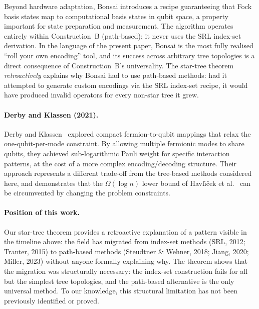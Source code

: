 Beyond hardware adaptation, Bonsai introduces a recipe guaranteeing
that Fock basis states map to computational basis states in qubit
space, a property important for state preparation and measurement.
The algorithm operates entirely within Construction~B (path-based);
it never uses the SRL index-set derivation.  In the language of the
present paper, Bonsai is the most fully realised ``roll your own
encoding'' tool, and its success across arbitrary tree topologies is
a direct consequence of Construction~B's universality.  The star-tree
theorem \emph{retroactively} explains why Bonsai had to use
path-based methods: had it attempted to generate custom encodings
via the SRL index-set recipe, it would have produced invalid
operators for every non-star tree it grew.

\paragraph{Derby and Klassen (2021).}
Derby and Klassen~\cite{derby2021} explored compact fermion-to-qubit
mappings that relax the one-qubit-per-mode constraint.  By allowing
multiple fermionic modes to share qubits, they achieved
sub-logarithmic Pauli weight for specific interaction patterns,
at the cost of a more complex encoding/decoding structure.  Their
approach represents a different trade-off from the tree-based methods
considered here, and demonstrates that the $\Omega(\log n)$ lower
bound of Havl\'{\i}\v{c}ek et al.~\cite{havlicek2017} can be
circumvented by changing the problem constraints.

\paragraph{Position of this work.}
Our star-tree theorem provides a retroactive explanation of a pattern
visible in the timeline above: the field has migrated from index-set
methods (SRL, 2012; Tranter, 2015) to path-based methods (Steudtner
\& Wehner, 2018; Jiang, 2020; Miller, 2023) without anyone formally
explaining why.  The theorem shows that the migration was structurally
necessary: the index-set construction fails for all but the simplest
tree topologies, and the path-based alternative is the only universal
method.  To our knowledge, this structural limitation has not been
previously identified or proved.
